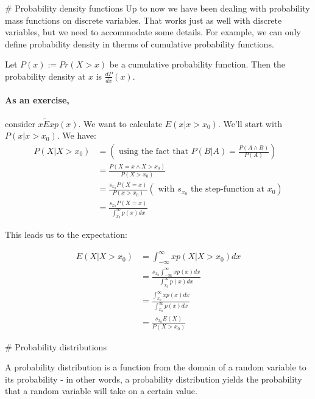  
# Probability density functions
Up to now we have been dealing with probability mass functions on discrete variables.
That works just as well with discrete variables, but we need to accommodate some details.
For example, we can only define probability density in therms of cumulative probability functions.

Let $P(x) := Pr(X > x)$ be a cumulative probability function.
Then the probability density at $x$ is $\frac{d P}{d x}(x)$.

\paragraph{As an exercise,} consider $x \tilde Exp(x)$. We want to calculate $E(x | x > x_0)$. 
We'll start with $P(x | x > x_0)$.
We have:
\begin{equation}
    \begin{aligned}
        P(X | X > x_0) &= \left( \text{ using the fact that } P(B|A) = \frac{P(A \land B)}{P(A)} \right) \\
                          &= \frac{ P(X = x \land X > x_0) }{ P(X > x_0) } \\
                          &= \frac{ s_{x_0} P(X=x) }{ P(x > x_0) }  (\text{ with $s_{x_0}$ the step-function at $x_0$}) \\
                          &= \frac{ s_{x_0} P(X=x) }{ \int_{x_0}^\infty p(x) dx }
    \end{aligned}
\end{equation}

This leads us to the expectation:

\begin{equation}
    \begin{aligned}
        E(X | X > x_0)  &= \int_{-\infty}^\infty x p(X | X > x_0) dx \\
                        &= \frac{ s_{x_0} \int_{-\infty}^\infty x p(x) dx }{ \int_{x_0}^\infty p(x) dx } \\
                        &= \frac{ \int_{x_0}^\infty x p(x) dx }{ \int_{x_0}^\infty p(x) dx } \\
                        &= \frac{ s_{x_0} E(X) }{ P(X > x_0) } 
    \end{aligned}
\end{equation}


# Probability distributions

A probability distribution is a function from the domain of a random variable to its probability - in other words, a probability distribution yields the probability that a random variable will take on a certain value. 

